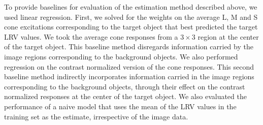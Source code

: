 \documentclass{jov}
\begin{document}
To provide baselines for evaluation of the estimation method described above, we used linear regression.
First, we solved for the weights on the average L, M and S cone excitations corresponding to the target object that best predicted the target LRV values.
We took the average cone responses from a $3 \times 3$ region at the center of the target object.
This baseline method disregards information carried by the image regions corresponding to the background objects.
We also performed regression on the contrast normalized version of the cone responses.
This second baseline method indirectly incorporates information carried in the image regions corresponding to the background objects,
through their effect on the contrast normalized responses at the center of the target object. 
We also evaluated the performance of a naive model that uses the mean of the LRV values in the training set as the estimate, irrespective
of the image data.
\end{document}
